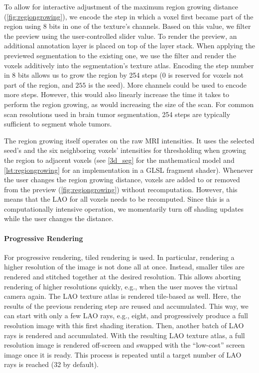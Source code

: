 \documentclass[sigconf]{acmart}
\begin{document}
To allow for interactive adjustment of the maximum region growing distance (\cref{fig:regiongrowing}), we encode the step in which a voxel first became part of the region using 8 bits in one of the texture's channels. 
Based on this value, we filter the preview using the user-controlled slider value. To render the preview, an additional annotation layer is placed on top of the layer stack.
When applying the previewed segmentation to the existing one, we use the filter and render the voxels additively into the segmentation's texture atlas.
Encoding the step number in 8 bits allows us to grow the region by 254 steps ($0$ is reserved for voxels not part of the region, and $255$ is the seed). 
More channels could be used to encode more steps.
However, this would also linearly increase the time it takes to perform the region growing, as would increasing the size of the scan.
For common scan resolutions used in brain tumor segmentation, 254 steps are typically sufficient to segment whole tumors.

The region growing itself operates on the raw MRI intensities. 
It uses the selected seed's and the six neighboring voxels' intensities for thresholding when growing the region to adjacent voxels (see \cref{3d_seg} for the mathematical model and \cref{lst:regiongrowing} for an implementation in a GLSL fragment shader).
Whenever the user changes the region growing distance, voxels are added to or removed from the preview (\cref{fig:regiongrowing}) without recomputation. 
However, this means that the LAO for all voxels needs to be recomputed. 
Since this is a computationally intensive operation, we momentarily turn off shading updates while the user changes the distance.

\paragraph{Progressive Rendering}
For progressive rendering, tiled rendering is used.
In particular, rendering a higher resolution of the image is not done all at once.
Instead, smaller tiles are rendered and stitched together at the desired resolution.
This allows aborting rendering of higher resolutions quickly, e.g., when the user moves the virtual camera again. 
The LAO texture atlas is rendered tile-based as well.
Here, the results of the previous rendering step are reused and accumulated.
This way, we can start with only a few LAO rays, e.g., eight, and progressively produce a full resolution image with this first shading iteration. 
Then, another batch of LAO rays is rendered and accumulated.
With the resulting LAO texture atlas, a full resolution image is rendered off-screen and swapped with the \enquote{low-cost} screen image once it is ready. 
This process is repeated until a target number of LAO rays is reached (32 by default).
\end{document}
